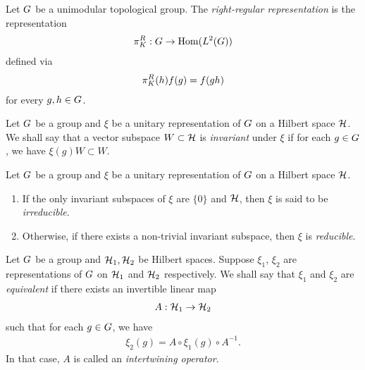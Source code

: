 \begin{example}
    Let $G$ be a unimodular topological group.
    The \emph{right-regular representation} is the representation
    \begin{align*}
        \pi^R_{K} : G \to \operatorname{Hom}({L^{2} (G)})
    \end{align*}
    defined via
    \begin{align*}
        \pi^R_{K}(h) f(g) = f(g h)
    \end{align*}
    for every $g, h \in G$.
\end{example}

\begin{definition}
\label{definition:invariant_subspaces}
    Let $G$ be a group and $\xi$ be a unitary representation of $G$ on a Hilbert space $\mathcal{H}$.
    We shall say that a vector subspace $W \subset \mathcal{H}$ is \emph{invariant} under $\xi$
    if for each $g \in G$, we have $\xi(g) W \subset W$.
\end{definition}

\begin{definition}[Irreducibility]
\label{definition:irreducible_representations}
    Let $G$ be a group and $\xi$ be a unitary representation of $G$ on a Hilbert space $\mathcal{H}$.
    \begin{enumerate}
        \item If the only invariant subspaces of $\xi$ are $\{0\}$ and $\mathcal{H}$,
            then $\xi$ is said to be \emph{irreducible}.
        \item Otherwise, if there exists a non-trivial invariant subspace,
            then $\xi$ is \emph{reducible}.
    \end{enumerate}
\end{definition}

\begin{definition}
\label{definition:equivalent_representations}
    Let $G$ be a group and $\mathcal{H}_1, \mathcal{H}_2$ be Hilbert spaces.
    Suppose $\xi_1$, $\xi_2$ are representations of $G$ on $\mathcal{H}_1$ and $\mathcal{H}_2$ respectively.
    We shall say that $\xi_1$ and $\xi_2$ are \emph{equivalent}
    if there exists an invertible linear map
    \begin{align*}
        A : \mathcal{H}_1 \to \mathcal{H}_2
    \end{align*}
    such that for each $g \in G$, we have
    \begin{align*}
        \xi_2(g) = A \circ \xi_1(g) \circ A^{-1}.
    \end{align*}
    In that case, $A$ is called an \emph{intertwining operator}.
\end{definition}

